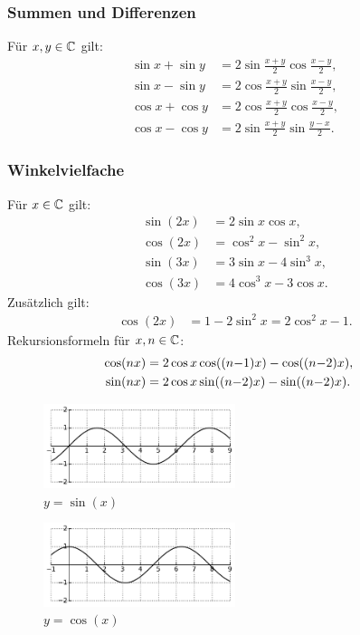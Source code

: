\subsubsection{Summen und Differenzen}
Für $x,y\in\mathbb C$ gilt:
\begin{align}
\sin x+\sin y &= 2\sin\frac{x+y}{2}\cos\frac{x-y}{2},\\
\sin x-\sin y &= 2\cos\frac{x+y}{2}\sin\frac{x-y}{2},\\
\cos x+\cos y &= 2\cos\frac{x+y}{2}\cos\frac{x-y}{2},\\
\cos x-\cos y &= 2\sin\frac{x+y}{2}\sin\frac{y-x}{2}.
\end{align}

\subsubsection{Winkelvielfache}
Für $x\in\mathbb C$ gilt:
\begin{align}
\sin(2x) &= 2\sin x\cos x,\\
\cos(2x) &= \cos^2 x-\sin^2 x,\\
\sin(3x) &= 3\sin x-4\sin^3 x,\\
\cos(3x) &= 4\cos^3 x-3\cos x.
\end{align}
Zusätzlich gilt:
\begin{align}
\cos(2x) &= 1-2\sin^2 x = 2\cos^2 x-1.
\end{align}
Rekursionsformeln für $x,n\in\mathbb C$:
\begin{align}
\hspace{-1em}\cos(nx) &= 2\cos x \cos((n{-}1)x) - \cos((n{-}2)x),\\
\hspace{-1em}\sin(nx) &= 2\cos x \sin((n{-}2)x) - \sin((n{-}2)x).
\end{align}

\begin{figure}[h]
\includegraphics[width=0.5\textwidth]{img/sin.pdf}
\caption{$y=\sin(x)$}
\end{figure}

\begin{figure}[h]
\includegraphics[width=0.5\textwidth]{img/cos.pdf}
\caption{$y=\cos(x)$}
\end{figure}

